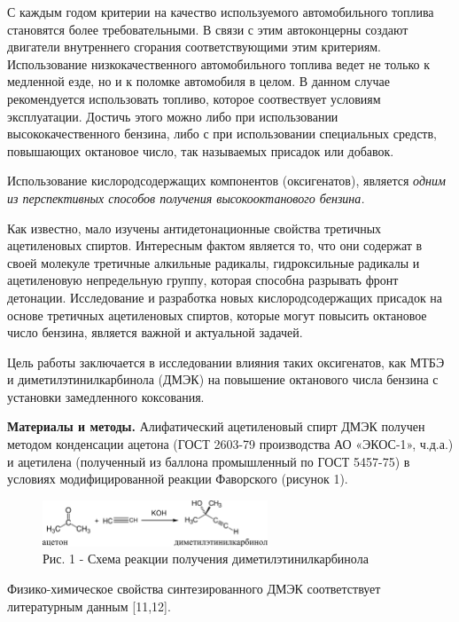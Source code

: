 \begin{multicols}{2}
С каждым годом критерии на качество используемого автомобильного топлива
становятся более требовательными. В связи с этим автоконцерны создают
двигатели внутреннего сгорания соответствующими этим критериям.
Использование низкокачественного автомобильного топлива ведет не только
к медленной езде, но и к поломке автомобиля в целом. В данном случае
рекомендуется использовать топливо, которое соотвествует условиям
эксплуатации. Достичь этого можно либо при использовании
высококачественного бензина, либо с при использовании специальных
средств, повышающих октановое число, так называемых присадок или
добавок.

Использование кислородсодержащих компонентов (оксигенатов), является
\emph{одним из перспективных способов получения высокооктанового
бензина.}

Как известно, мало изучены антидетонационные свойства третичных
ацетиленовых спиртов. Интересным фактом является то, что они содержат в
своей молекуле третичные алкильные радикалы, гидроксильные радикалы и
ацетиленовую непредельную группу, которая способна разрывать фронт
детонации. Исследование и разработка новых кислородсодержащих присадок
на основе третичных ацетиленовых спиртов, которые могут повысить
октановое число бензина, является важной и актуальной задачей.

Цель работы заключается в исследовании влияния таких оксигенатов, как
МТБЭ и диметилэтинилкарбинола (ДМЭК) на повышение октанового числа
бензина с установки замедленного коксования.

{\bfseries Материалы и методы.} Алифатический ацетиленовый спирт ДМЭК
получен методом конденсации ацетона (ГОСТ 2603-79 производства АО
«ЭКОС-1», ч.д.а.) и ацетилена (полученный из баллона промышленный по
ГОСТ 5457-75) в условиях модифицированной реакции Фаворского (рисунок
1).
\end{multicols}

\begin{figure}[H]
	\centering
	\includegraphics[width=0.6\textwidth]{media/chem/image13}
	\caption*{Рис. 1 - Схема реакции получения диметилэтинилкарбинола}
\end{figure}

Физико-химическое свойства синтезированного ДМЭК соответствует
литературным данным {[}11,12{]}.

